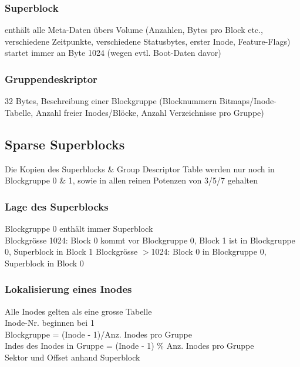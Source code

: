 \subsubsection{Superblock}
enthält alle Meta-Daten übers Volume (Anzahlen, Bytes pro Block etc., verschiedene Zeitpunkte, verschiedene Statusbytes, erster Inode, Feature-Flags)\\
startet immer an Byte 1024 (wegen evtl. Boot-Daten davor)

\subsubsection{Gruppendeskriptor}
32 Bytes, Beschreibung einer Blockgruppe (Blocknummern Bitmaps/Inode-Tabelle, Anzahl freier Inodes/Blöcke, Anzahl Verzeichnisse pro Gruppe)

\subsection{Sparse Superblocks}
Die Kopien des Superblocks \& Group Descriptor Table werden nur noch in Blockgruppe 0 \& 1, sowie in allen reinen Potenzen von 3/5/7 gehalten

\subsubsection{Lage des Superblocks}
Blockgruppe 0 enthält immer Superblock\\
Blockgrösse 1024: Block 0 kommt vor Blockgruppe 0, Block 1 ist in Blockgruppe 0, Superblock in Block 1
Blockgrösse $>$1024: Block 0 in Blockgruppe 0, Superblock in Block 0

\subsubsection{Lokalisierung eines Inodes}
Alle Inodes gelten als eine grosse Tabelle\\
Inode-Nr. beginnen bei 1\\
Blockgruppe = (Inode - 1)/Anz. Inodes pro Gruppe\\
Indes des Inodes in Gruppe = (Inode - 1) \% Anz. Inodes pro Gruppe\\
Sektor und Offset anhand Superblock


